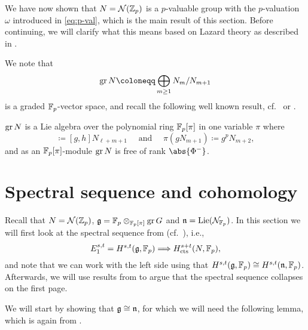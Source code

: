 We have now shown that $N = \mathcal{N}(\mathbb{Z}_{p})$ is a $p$-valuable group with the $p$-valuation $\omega$ introduced in \eqref{eq:p-val}, which is the main result of this section. Before continuing, we will clarify what this means based on Lazard theory as described in .

We note that
\begin{equation*}
  \gr N \coloneqq \bigoplus_{m\geq1} N_{m}/N_{m+1}
\end{equation*}
is a graded $\mathbb{F}_{p}$-vector space, and recall the following well known result, cf.\ \cite{Laz} or \cite[Sect.~25]{Sch}.

\begin{proposition}
  $\operatorname{gr} N$ is a Lie algebra over the polynomial ring $\mathbb{F}_{p}[\pi]$ in one variable $\pi$ where
  \begin{equation*}
    [gN_{\ell+1},hN_{m+1}] \coloneqq [g,h]N_{\ell+m+1} \quad \text{ and } \quad \pi(gN_{m+1}) \coloneqq g^{p}N_{m+2},
  \end{equation*}
  and as an $\mathbb{F}_{p}[\pi]$-module $\operatorname{gr} N$ is free of rank $\abs{\Phi^{-}}$.
\end{proposition}


\section[Spectral sequence]{Spectral sequence and cohomology}\label{sec:specsec}

Recall that $N = \mathcal{N}(\mathbb{Z}_{p})$, $\mathfrak{g} = \mathbb{F}_p \otimes_{\mathbb{F}_p[\pi]} \operatorname{gr} G$ and $\mathfrak{n} = \operatorname{Lie}(\mathcal{N}_{\mathbb{F}_{p}})$. In this section we will first look at the spectral sequence from \cite{Sor} (cf.\ ), i.e.,
\begin{equation*}
  E_{1}^{s,t} = H^{s,t}(\mathfrak{g}, \mathbb{F}_{p}) \Longrightarrow H_{\mathrm{cts}}^{s+t}(N,\mathbb{F}_{p}),
\end{equation*}
and note that we can work with the left side using that $H^{s,t}(\mathfrak{g},\mathbb{F}_{p}) \cong H^{s,t}(\mathfrak{n},\mathbb{F}_{p})$. %
Afterwards, we will use results from \cite{PT} to argue that the spectral sequence collapses on the first page.

We will start by showing that $\mathfrak{g} \cong \mathfrak{n}$, for which we will need the following lemma, which is again from \cite{Sch-notes}.

